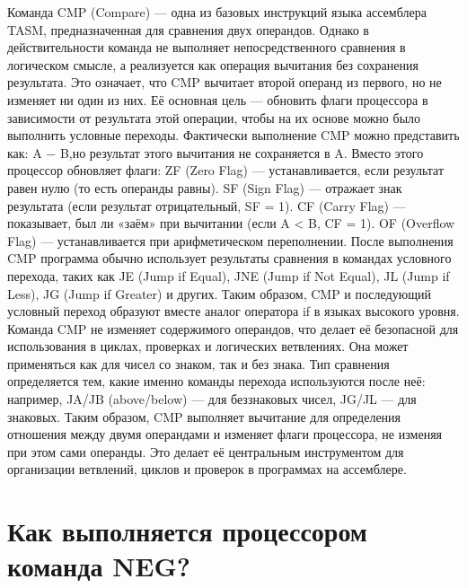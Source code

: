 Команда CMP (Compare) — одна из базовых инструкций языка ассемблера TASM, предназначенная для сравнения двух операндов. Однако в действительности команда не выполняет непосредственного сравнения в логическом смысле, а реализуется как операция вычитания без сохранения результата. Это означает, что CMP вычитает второй операнд из первого, но не изменяет ни один из них. Её основная цель — обновить флаги процессора в зависимости от результата этой операции, чтобы на их основе можно было выполнить условные переходы.
Фактически выполнение CMP можно представить как:
A − B,но результат этого вычитания не сохраняется в A. Вместо этого процессор обновляет флаги:
ZF (Zero Flag) — устанавливается, если результат равен нулю (то есть операнды равны).
SF (Sign Flag) — отражает знак результата (если результат отрицательный, SF = 1).
CF (Carry Flag) — показывает, был ли «заём» при вычитании (если A < B, CF = 1).
OF (Overflow Flag) — устанавливается при арифметическом переполнении.
После выполнения CMP программа обычно использует результаты сравнения в командах условного перехода, таких как JE (Jump if Equal), JNE (Jump if Not Equal), JL (Jump if Less), JG (Jump if Greater) и других. Таким образом, CMP и последующий условный переход образуют вместе аналог оператора if в языках высокого уровня.
Команда CMP не изменяет содержимого операндов, что делает её безопасной для использования в циклах, проверках и логических ветвлениях. Она может применяться как для чисел со знаком, так и без знака. Тип сравнения определяется тем, какие именно команды перехода используются после неё: например, JA/JB (above/below) — для беззнаковых чисел, JG/JL — для знаковых.
Таким образом, CMP выполняет вычитание для определения отношения между двумя операндами и изменяет флаги процессора, не изменяя при этом сами операнды. Это делает её центральным инструментом для организации ветвлений, циклов и проверок в программах на ассемблере.

\section{Как выполняется процессором команда NEG?}


